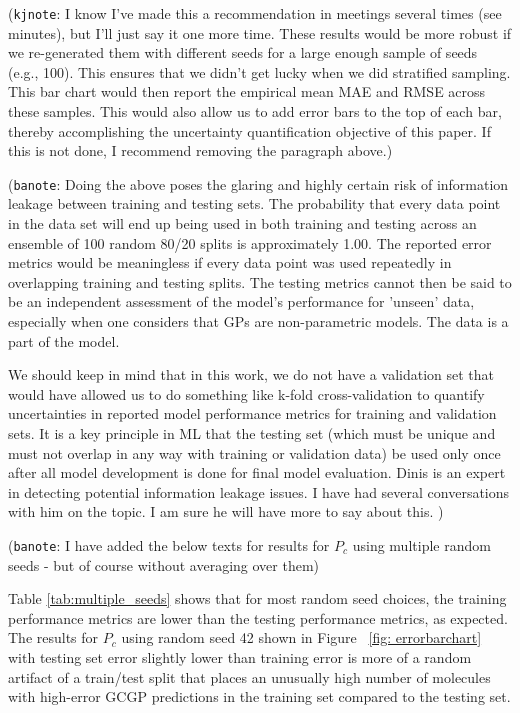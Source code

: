\documentclass[journal=jacsat,manuscript=article, ]{achemso}
\newcommand{\kjnote}[1]{{\color{Blue} (\texttt{kjnote}: #1)}}
\newcommand{\banote}[1]{{\color{Salmon} (\texttt{banote}: #1)}}
\begin{document}
\kjnote{I know I've made this a recommendation in meetings several times (see minutes), but I'll just say it one more time. These results would be more robust if we re-generated them with different seeds for a large enough sample of seeds (e.g., 100). This ensures that we didn't get lucky when we did stratified sampling. This bar chart would then report the empirical mean MAE and RMSE across these samples. This would also allow us to add error bars to the top of each bar, thereby accomplishing the uncertainty quantification objective of this paper. If this is not done, I recommend removing the paragraph above.}

\banote{Doing the above poses the glaring and highly certain risk of information leakage between training and testing sets. The probability that every data point in the data set will end up being used in both training and testing across an ensemble of 100 random 80/20 splits is approximately 1.00. The reported error metrics would be meaningless if every data point was used repeatedly in overlapping training and testing splits. The testing metrics cannot then be said to be an independent assessment of the model's performance for 'unseen' data, especially when one considers that GPs are non-parametric models. The data is a part of the model. 

We should keep in mind that in this work, we do not have a validation set that would have allowed us to do something like k-fold cross-validation to quantify uncertainties in reported model performance metrics for training and validation sets. It is a key principle in ML that the testing set (which must be unique and must not overlap in any way with training or validation data) be used only once after all model development is done for final model evaluation. 
Dinis is an expert in detecting potential information leakage issues. I have had several conversations with him on the topic. I am sure he will have more to say about this. }

\banote{I have added the below texts for results for $P_c$ using multiple random seeds - but of course without averaging over them}

Table \ref{tab:multiple_seeds} shows that for most random seed choices, the training performance metrics are lower than the testing performance metrics, as expected. 
The results for $P_c$ using random seed 42 shown in Figure ~\ref{fig: errorbarchart} with testing set error slightly lower than training error is more of a random artifact of a train/test split that places an unusually high number of molecules with high-error GCGP predictions in the training set compared to the testing set.
\end{document}

